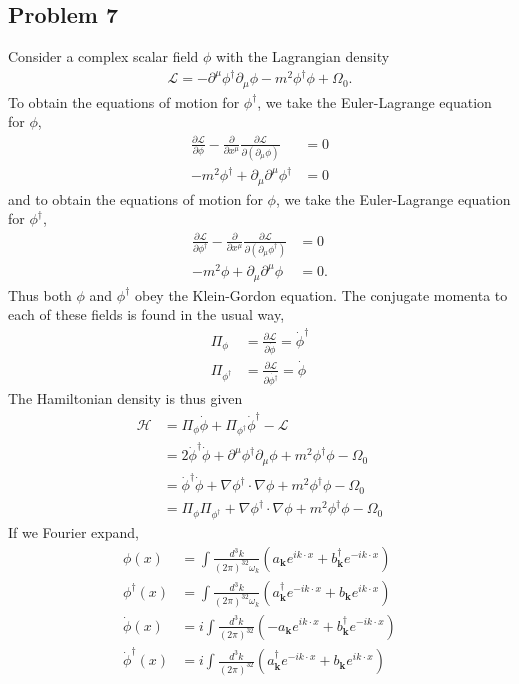 \documentclass{mathnotes}
\begin{document}
\subsection*{Problem 7}

Consider a complex scalar field $\phi$ with the Lagrangian density
\begin{align*}
    \mathcal{L}=-\partial^\mu\phi^\dagger\partial_\mu\phi - m^2\phi^\dagger\phi + \Omega_0.
\end{align*}
To obtain the equations of motion for $\phi^\dagger$, we take the Euler-Lagrange equation for $\phi$,
\begin{align*}
    \frac{\partial \mathcal{L}}{\partial\phi}-\frac{\partial}{\partial x^\mu}\frac{\partial\mathcal{L}}{\partial(\partial_\mu\phi)}&=0\\
    -m^2\phi^\dagger+\partial_\mu\partial^\mu\phi^\dagger&=0
\end{align*}
and to obtain the equations of motion for $\phi$, we take the Euler-Lagrange equation for $\phi^\dagger$,
\begin{align*}
    \frac{\partial \mathcal{L}}{\partial\phi^\dagger}-\frac{\partial}{\partial x^\mu}\frac{\partial\mathcal{L}}{\partial(\partial_\mu\phi^\dagger)}&=0\\
    -m^2\phi+\partial_\mu\partial^\mu\phi&=0.
\end{align*}
Thus both $\phi$ and $\phi^\dagger$ obey the Klein-Gordon equation. The conjugate momenta to each of these fields is found in the usual way,
\begin{align*}
    \Pi_{\phi}&=\frac{\partial\mathcal{L}}{\partial\dot{\phi}}=\dot{\phi}^\dagger\\
    \Pi_{\phi^\dagger}&=\frac{\partial\mathcal{L}}{\partial\dot{\phi^\dagger}}=\dot{\phi}
\end{align*}
The Hamiltonian density is thus given
\begin{align*}
    \mathcal{H}&=\Pi_\phi \dot{\phi}+\Pi_{\phi^\dagger}\dot{\phi}^\dagger-\mathcal{L}\\
    &=2\dot{\phi}^\dagger\dot{\phi}+\partial^\mu\phi^\dagger\partial_\mu\phi + m^2\phi^\dagger\phi - \Omega_0\\
    &=\dot{\phi}^\dagger\dot{\phi}+\nabla\phi^\dagger\cdot\nabla\phi+m^2\phi^\dagger\phi-\Omega_0\\
    &=\Pi_{\phi}\Pi_{\phi^\dagger}+\nabla\phi^\dagger\cdot\nabla\phi+m^2\phi^\dagger\phi-\Omega_0
\end{align*}
If we Fourier expand,
\begin{align*}
    \phi(x)&=\int \frac{d^3k}{(2\pi)^32\omega_k}\left( a_\mathbf{k}e^{ik\cdot x}+b^\dagger_\mathbf{k}e^{-ik\cdot x} \right)\\
    \phi^\dagger(x)&=\int \frac{d^3k}{(2\pi)^32\omega_k}\left( a_\mathbf{k}^\dagger e^{-ik\cdot x}+b_\mathbf{k}e^{ik\cdot x} \right)\\
    \dot{\phi}(x)&=i\int \frac{d^3k}{(2\pi)^32}\left( -a_\mathbf{k}e^{ik\cdot x}+b^\dagger_\mathbf{k}e^{-ik\cdot x} \right)\\
    \dot{\phi}^\dagger(x)&=i\int \frac{d^3k}{(2\pi)^32}\left(a_\mathbf{k}^\dagger e^{-ik\cdot x}+b_\mathbf{k}e^{ik\cdot x} \right)
\end{align*}
\end{document}
